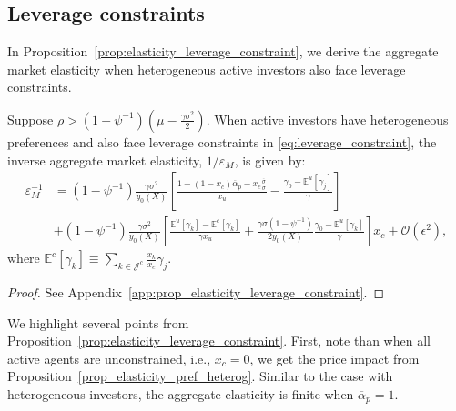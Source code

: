 \subsection{Leverage constraints}
In Proposition~\ref{prop:elasticity_leverage_constraint}, we derive the aggregate market elasticity when heterogeneous active investors also face leverage constraints.
\begin{prop}\label{prop:elasticity_leverage_constraint}
	Suppose $\rho>\left(1-\psi^{-1}\right)\left( \mu - \frac{\gamma\sigma^2}{2}  \right)$. When active investors have heterogeneous preferences and also face leverage constraints in \eqref{eq:leverage_constraint}, the inverse aggregate market elasticity, $ 1/\varepsilon_M $, is given by:
		\begin{align}		
		\varepsilon_M^{-1}&=
		\left(1-\psi^{-1}\right) \frac{\gamma \sigma^{2}}{y_{0}(X)}\left[\frac{1-(1-x_c)\overline{\alpha}_{p}-x_c\frac{\overline{\sigma}}{\sigma}}{x_{u}}-\frac{\gamma_{0}-\mathbb{E}^{u}[\gamma_{j}]}{\gamma}\right]\nonumber\\
		&+\left(1-\psi^{-1}\right) \frac{\gamma \sigma^{2}}{y_{0}(X)}\left[\frac{\mathbb{E}^{u}[\gamma_{k}]-\mathbb{E}^{c}[\gamma_{k}]}{\gamma x_{u}}+\frac{\gamma \sigma\left(1-\psi^{-1}\right)}{2 y_{0}(X)} \frac{\gamma_{0}-\mathbb{E}^{u}[\gamma_{k}]}{\gamma}\right] x_{c}+\mathcal{O}\left(\epsilon^{2}\right),	\label{eq:elasticity_leverage_constraint}		
		\end{align}						
	where $ \mathbb{E}^c[\gamma_k] \equiv\sum_{k\in\mathcal{J}^c} \frac{x_k}{x_c} \gamma_j. $
\end{prop}
\begin{proof}
	See Appendix~\ref{app:prop_elasticity_leverage_constraint}.
\end{proof}
We highlight several points from Proposition~\ref{prop:elasticity_leverage_constraint}. First, note than when all active agents are unconstrained, i.e., $ x_c=0 $, we get the price impact from Proposition~\ref{prop_elasticity_pref_heterog}. Similar to the case with heterogeneous investors, the aggregate elasticity is finite when $ \overline{\alpha}_p=1 $.

